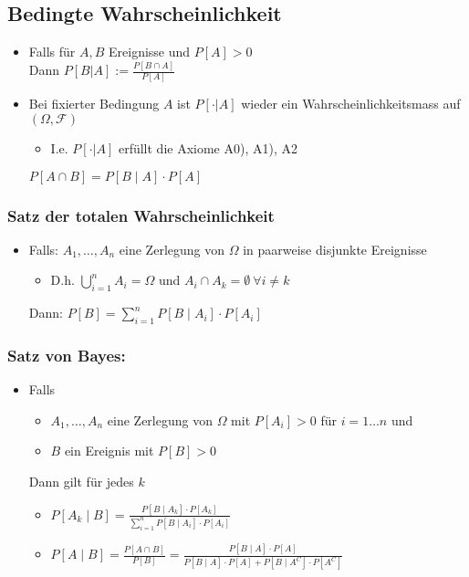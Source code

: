 \subsection{Bedingte Wahrscheinlichkeit}
\begin{itemize}
    \item Falls für $A,B$ Ereignisse und $P[A] > 0$\\
    Dann $P[B | A] := \frac{P[B \cap A]}{P[A]}$
     \item Bei fixierter Bedingung $A$ ist $P[\cdot | A]$ wieder ein Wahrscheinlichkeitsmass auf $(\Omega, \mathcal{F})$
        \begin{itemize}
            \item I.e. $P[\cdot | A]$ erfüllt die Axiome A0), A1), A2
        \end{itemize}
     $P[A \cap B] = P[B \mid A] \cdot P[A]$
\end{itemize}

\subsubsection{Satz der totalen Wahrscheinlichkeit}
\begin{itemize}
    \item Falls: $A_1,\dots,A_n$ eine Zerlegung von $\Omega$ in paarweise disjunkte Ereignisse
        \begin{itemize}
            \item D.h. $\bigcup_{i=1}^n A_i = \Omega$ und $A_i \cap A_k = \emptyset \: \forall i\neq k$
        \end{itemize}
    Dann: $ P[B] = \sum_{i=1}^n P[B \mid A_i] \cdot P[A_i]$
\end{itemize}

\subsubsection{Satz von Bayes:}
\begin{itemize}
    \item Falls
        \begin{itemize}
            \item $A_1,\dots, A_n$ eine Zerlegung von $\Omega$ mit $P[A_i] > 0$ für $i = 1 \dots n$ und
            \item $B$ ein Ereignis mit $P[B] > 0$
        \end{itemize}
    Dann gilt für jedes $k$
        \begin{itemize}
            \item $ P[A_k \mid B] = \frac{P[B \mid A_k]\cdot P[A_k]}{\sum_{i=1}^n P[B \mid A_i] \cdot P[A_i]}$
            \item $P[A\mid B] =
                \frac{P[A \cap B]}{P[B]} =
	            \frac{P[B\mid A]\cdot P[A]}{P[B\mid A]\cdot P[A] + P[B \mid A^C]\cdot P[A^C]}$
        \end{itemize}
\end{itemize}


